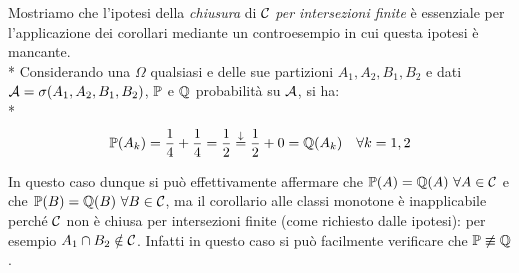 \medskip
\begin{cese}
  Mostriamo che l'ipotesi della \emph{chiusura} di $\mathcal C$ \emph{per intersezioni finite} è essenziale per l'applicazione dei corollari mediante un controesempio in cui questa ipotesi è mancante. \\*
  Considerando una $\Omega$ qualsiasi e delle sue partizioni $A_1, A_2, B_1, B_2$ e dati $\mathcal A = \sigma(A_1, A_2, B_1, B_2)$,
  $\mathbb P$ e $\mathbb Q$ probabilità su $\mathcal A$, si ha: \\*
  $$\mathbb P(A_k) = \frac{1}{4} + \frac{1}{4} = \frac{1}{2} \stackrel{\downarrow}{=} \frac{1}{2} + 0 = \mathbb Q(A_k) \quad \forall k = 1, 2$$
  \begin{figure}[H]
    \centering
    \def\drect {(0,0) rectangle (3,2)}
    \def\prect {(0,0) rectangle (1.5,1)}
    \def\srect {(1.5,0) rectangle (3,1)}
    \def\trect {(0,1) rectangle (1.5,2)}
    \def\qrect {(1.5,1) rectangle (3,2)}

  \end{figure}
  In questo caso dunque si può effettivamente affermare che $\mathbb P(A) = \mathbb Q(A) \ \forall A \in \mathcal C$ e che $\mathbb P(B) = \mathbb Q(B) \ \forall B \in \mathcal C$, ma il corollario alle classi monotone è inapplicabile perché $\mathcal C$ non è chiusa per intersezioni finite (come richiesto dalle ipotesi): per esempio $A_1 \cap B_2 \notin \mathcal C$.
  Infatti in questo caso si può facilmente verificare che $\PP \centernot\equiv \QQ$.
\end{cese}

